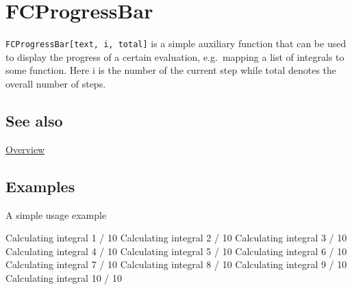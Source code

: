 \documentclass[../FeynCalcManual.tex]{subfiles}
\begin{document}
\hypertarget{fcprogressbar}{
\section{FCProgressBar}\label{fcprogressbar}}

\texttt{FCProgressBar[\allowbreak{}text,\ \allowbreak{}i,\ \allowbreak{}total]}
is a simple auxiliary function that can be used to display the progress
of a certain evaluation, e.g.~mapping a list of integrals to some
function. Here i is the number of the current step while total denotes
the overall number of steps.

\subsection{See also}

\hyperlink{toc}{Overview}

\subsection{Examples}

A simple usage example

\begin{Shaded}
\begin{Highlighting}[]
\OperatorTok{[}\OperatorTok{[}\OperatorTok{,} \OperatorTok{,} \OperatorTok{],} \OperatorTok{\{}\OperatorTok{,} \OperatorTok{,} \OperatorTok{\}]}\NormalTok{;}
\end{Highlighting}
\end{Shaded}

Calculating integral 1 / 10 Calculating integral 2 / 10 Calculating
integral 3 / 10 Calculating integral 4 / 10 Calculating integral 5 / 10
Calculating integral 6 / 10 Calculating integral 7 / 10 Calculating
integral 8 / 10 Calculating integral 9 / 10 Calculating integral 10 / 10
\end{document}
